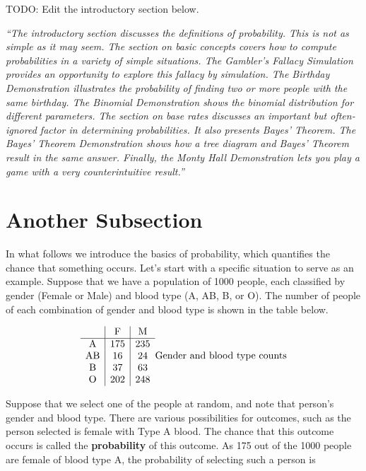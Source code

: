 \documentclass[
]{book}
\begin{document}
TODO: Edit the introductory section below.

\emph{``The introductory section discusses the definitions of probability. This is not as simple as it may seem.
The section on basic concepts covers how to compute probabilities in a variety of simple situations.
The Gambler's Fallacy Simulation provides an opportunity to explore this fallacy by simulation.
The Birthday Demonstration illustrates the probability of finding two or more people with the same birthday.
The Binomial Demonstration shows the binomial distribution for different parameters.
The section on base rates discusses an important but often-ignored factor in determining probabilities. It also presents Bayes' Theorem.
The Bayes' Theorem Demonstration shows how a tree diagram and Bayes' Theorem result in the same answer.
Finally, the Monty Hall Demonstration lets you play a game with a very counterintuitive result.''}

\hypertarget{another-subsection}{%
\section{Another Subsection}\label{another-subsection}}

In what follows we introduce the basics of probability, which quantifies the chance that something occurs.
Let's start with a specific situation to serve as an example. Suppose that we have a population of 1000 people,
each classified by gender (Female or Male) and blood type (A, AB, B, or O).
The number of people of each combination of gender and blood type is shown in the table below.

\[
\begin{array}{c|c|c}
           & \mathrm{F} & \mathrm{M}\\ \hline
\mathrm{A} & 175 & 235 \\ 
\mathrm{AB} & 16 & 24 \\ 
\mathrm{B} & 37 & 63 \\ 
\mathrm{O} & 202 & 248 \\ 
\end{array}\\
\mbox{Gender and blood type counts}
\]

Suppose that we select one of the people at random, and note that person's gender and blood type.
There are various possibilities for outcomes, such as the person selected is female with Type A blood.
The chance that this outcome occurs is called the \textbf{probability} of this outcome.
As 175 out of the 1000 people are female of blood type A, the probability of selecting such a person is
\end{document}
